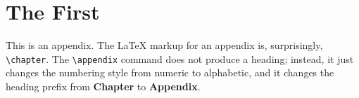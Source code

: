 
\chapter{The First}

This is an appendix.  The \LaTeX{} markup for an appendix
is, surprisingly, \verb=\chapter=.  The \verb=\appendix= command does
not produce a heading; instead, it just changes the numbering style
from numeric to alphabetic, and it changes the heading prefix from
\textbf{Chapter} to \textbf{Appendix}.

\blah \blah \blah
